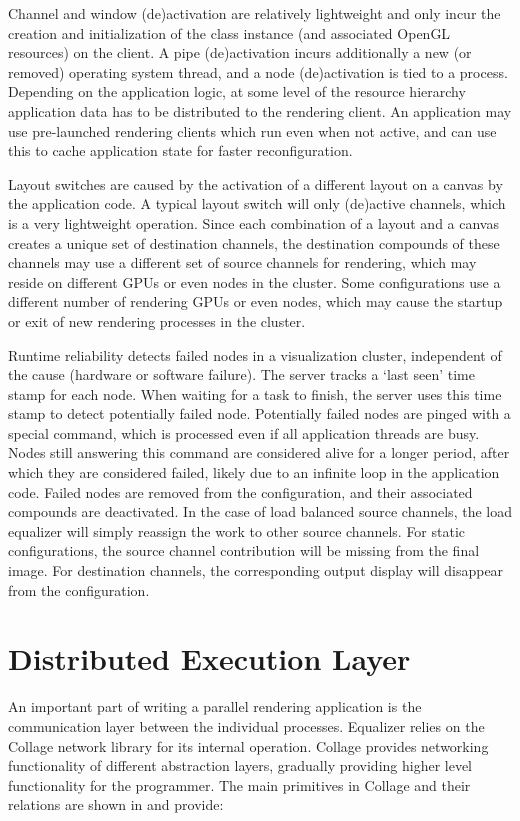 Channel and window (de)activation are relatively lightweight and only incur the
creation and initialization of the class instance (and associated OpenGL
resources) on the client. A pipe (de)activation incurs additionally a new (or
removed) operating system thread, and a node (de)activation is tied to a
process. Depending on the application logic, at some level of the resource
hierarchy application data has to be distributed to the rendering client. An
application may use pre-launched rendering clients which run even when not
active, and can use this to cache application state for faster reconfiguration.

Layout switches are caused by the activation of a different layout on a canvas
by the application code. A typical layout switch will only (de)active channels,
which is a very lightweight operation. Since each combination of a layout and a
canvas creates a unique set of destination channels, the destination compounds
of these channels may use a different set of source channels for rendering,
which may reside on different GPUs or even nodes in the cluster. Some
configurations use a different number of rendering GPUs or even nodes, which
may cause the startup or exit of new rendering processes in the cluster.

Runtime reliability detects failed nodes in a visualization cluster,
independent of the cause (hardware or software failure). The server tracks a
`last seen' time stamp for each node. When waiting for a task to finish, the
server uses this time stamp to detect potentially failed node. Potentially
failed nodes are pinged with a special command, which is processed even if all
application threads are busy. Nodes still answering this command are considered
alive for a longer period, after which they are considered failed, likely due
to an infinite loop in the application code. Failed nodes are removed from the
configuration, and their associated compounds are deactivated. In the case of
load balanced source channels, the load equalizer will simply reassign the work
to other source channels. For static configurations, the source channel
contribution will be missing from the final image. For destination channels,
the corresponding output display will disappear from the configuration.

\section{Distributed Execution Layer}

An important part of writing a parallel rendering application is the
communication layer between the individual processes. \textsf{Equalizer} relies
on the \textsf{Collage} network library for its internal operation.
\textsf{Collage} provides networking functionality of different abstraction
layers, gradually providing higher level functionality for the programmer. The
main primitives in \textsf{Collage} and their relations are shown in
 and provide:

